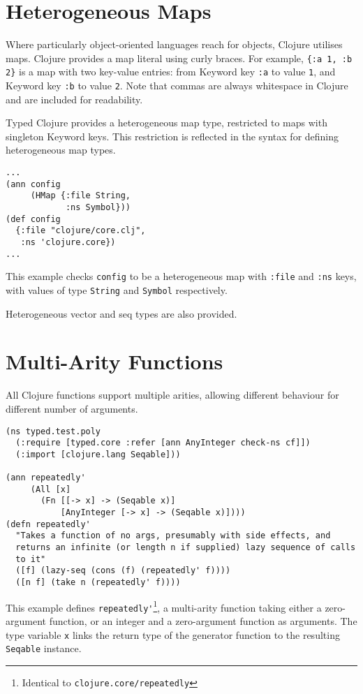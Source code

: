 \documentclass{cshonours}
\begin{document}
\section{Heterogeneous Maps}

Where particularly object-oriented languages reach for objects, Clojure
utilises maps. Clojure provides a map literal using curly braces. For example,
\lstinline|{:a 1, :b 2}| is a map with two key-value entries: from Keyword key \lstinline|:a|
to value \lstinline|1|, and Keyword key \lstinline|:b| to value \lstinline|2|. Note that commas are always
whitespace in Clojure and are included for readability.

Typed Clojure provides a heterogeneous map type, restricted to 
maps with singleton Keyword keys. This restriction is reflected
in the syntax for defining heterogeneous map types.

\begin{lstlisting}
...
(ann config
     (HMap {:file String,
            :ns Symbol}))
(def config
  {:file "clojure/core.clj",
   :ns 'clojure.core})
...
\end{lstlisting}

This example checks \lstinline|config| to be a heterogeneous map
with \lstinline|:file| and \lstinline|:ns| keys, with values of
type \lstinline|String| and \lstinline|Symbol| respectively.

Heterogeneous vector and seq types are also provided.

\section{Multi-Arity Functions}

All Clojure functions support multiple arities, allowing different
behaviour for different number of arguments.

\begin{lstlisting}
(ns typed.test.poly
  (:require [typed.core :refer [ann AnyInteger check-ns cf]])
  (:import [clojure.lang Seqable]))

(ann repeatedly'
     (All [x]
       (Fn [[-> x] -> (Seqable x)]
           [AnyInteger [-> x] -> (Seqable x)])))
(defn repeatedly'
  "Takes a function of no args, presumably with side effects, and
  returns an infinite (or length n if supplied) lazy sequence of calls
  to it"
  ([f] (lazy-seq (cons (f) (repeatedly' f))))
  ([n f] (take n (repeatedly' f))))
\end{lstlisting}

This example defines \lstinline|repeatedly'|\footnote{Identical to \lstinline|clojure.core/repeatedly|},
a multi-arity function taking either a zero-argument function, or an integer and a zero-argument function as arguments.
The type variable \lstinline|x| links the return type of the generator function to
the resulting \lstinline|Seqable| instance.
\end{document}
